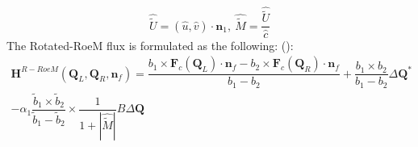 \documentclass[a4paper, 12pt]{article}
\begin{document}
\begin{equation}
    \hat{\tilde U} = (\hat u,\hat v)\cdot\textbf{n}_1, \: \hat{\tilde M}= \dfrac{\hat{\tilde U}}{\hat c}
\end{equation}
The Rotated-RoeM flux is formulated as the following: (\cite{rotated-roem}):
\begin{equation}
    \begin{split}
        \textbf{H}^{R-RoeM}(\textbf{Q}_L,\textbf{Q}_R,\textbf{n}_f)=\dfrac{b_1\times\textbf{F}_c(\textbf{Q}_L)\cdot\textbf{n}_f-b_2\times\textbf{F}_c(\textbf{Q}_R)\cdot\textbf{n}_f}{b_1-b_2}+\dfrac{b_1\times b_2}{b_1-b_2}\Delta\textbf{Q}^*\\-\alpha_1\dfrac{\tilde b_1\times \tilde b_2}{\tilde b_1- \tilde b_2}\times\dfrac{1}{1+|\hat{\tilde M}|}B\Delta\textbf{Q}
    \end{split}
\end{equation}
\end{document}

